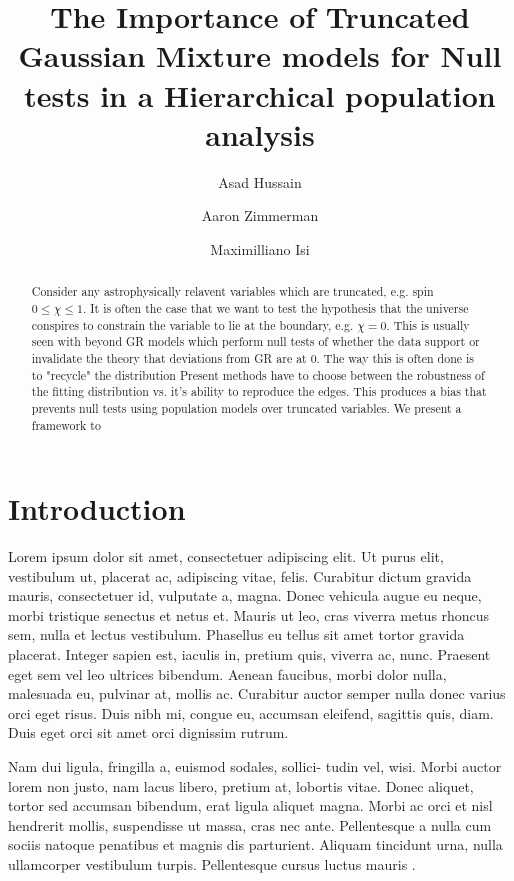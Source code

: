 \documentclass[twocolumn]{aastex631}
\begin{document}
\title{The Importance of Truncated Gaussian Mixture models for Null tests in a Hierarchical population analysis}

\author{Asad Hussain}
\author{Aaron Zimmerman}
\author{Maximilliano Isi}

\begin{abstract}
Consider any astrophysically relavent variables which are truncated, e.g. spin $0 \leq \chi \leq 1$.  It is often the case that we want to test the hypothesis that the universe conspires to constrain the variable to lie at the boundary, e.g. $\chi = 0$. This is usually seen with beyond GR models which perform null tests of whether the data support or invalidate the theory that deviations from GR are at $0$. The way this is often done is to "recycle" the distribution
Present methods have to choose between the robustness of the fitting distribution vs. it's ability to reproduce the edges. This produces a bias that prevents null tests using population models over truncated variables. We present a framework to 
\end{abstract}

\section{Introduction}
\label{sec:intro}

Lorem ipsum dolor sit amet, consectetuer adipiscing elit.
Ut purus elit, vestibulum ut, placerat ac, adipiscing vitae, felis.
Curabitur dictum gravida mauris, consectetuer id, vulputate a, magna.
Donec vehicula augue eu neque, morbi tristique senectus et netus et.
Mauris ut leo, cras viverra metus rhoncus sem, nulla et lectus vestibulum.
Phasellus eu tellus sit amet tortor gravida placerat.
Integer sapien est, iaculis in, pretium quis, viverra ac, nunc.
Praesent eget sem vel leo ultrices bibendum.
Aenean faucibus, morbi dolor nulla, malesuada eu, pulvinar at, mollis ac.
Curabitur auctor semper nulla donec varius orci eget risus.
Duis nibh mi, congue eu, accumsan eleifend, sagittis quis, diam.
Duis eget orci sit amet orci dignissim rutrum.

Nam dui ligula, fringilla a, euismod sodales, sollici- tudin vel, wisi.
Morbi auctor lorem non justo, nam lacus libero, pretium at, lobortis vitae.
Donec aliquet, tortor sed accumsan bibendum, erat ligula aliquet magna.
Morbi ac orci et nisl hendrerit mollis, suspendisse ut massa, cras nec ante.
Pellentesque a nulla cum sociis natoque penatibus et magnis dis parturient.
Aliquam tincidunt urna, nulla ullamcorper vestibulum turpis.
Pellentesque cursus luctus mauris \citep{Luger2021}.


\end{document}

